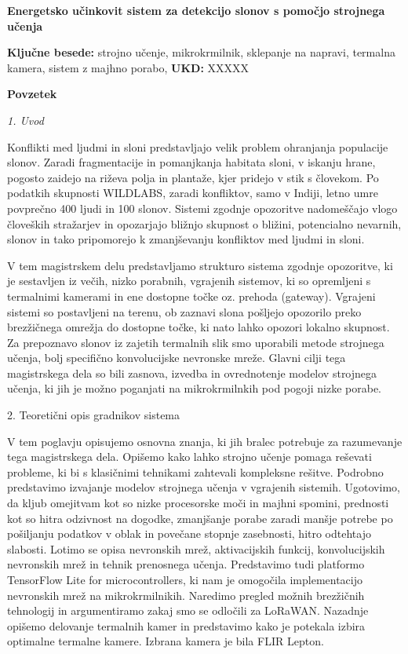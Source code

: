 \begin{poglavje}
\noindent\bfseries Energetsko učinkovit sistem za detekcijo slonov s pomočjo strojnega učenja
\end{poglavje}

\bigskip
\bigskip
\bigskip
\bigskip
\bigskip
\textbf{Ključne besede:} strojno učenje, mikrokrmilnik, sklepanje na napravi, termalna kamera, sistem z majhno porabo, 
\bigskip
\textbf{UKD:} XXXXX

\bigskip
\bigskip
\bigskip
\bigskip
\bigskip
\bigskip
\textbf{Povzetek}
\newline
\newline
{\itshape
1. Uvod

Konflikti med ljudmi in sloni predstavljajo velik problem ohranjanja populacije slonov.
Zaradi fragmentacije in pomanjkanja habitata sloni, v iskanju hrane, pogosto zaidejo na riževa polja in plantaže, kjer pridejo v stik s človekom.
Po podatkih skupnosti WILDLABS, zaradi konfliktov, samo v Indiji, letno umre povprečno 400 ljudi in 100 slonov.
Sistemi zgodnje opozoritve nadomeščajo vlogo človeških stražarjev in opozarjajo bližnjo skupnost o bližini, potencialno nevarnih, slonov in tako pripomorejo k zmanjševanju konfliktov med ljudmi in sloni.

V tem magistrskem delu predstavljamo strukturo sistema zgodnje opozoritve, ki je sestavljen iz večih, nizko porabnih, vgrajenih sistemov, ki so opremljeni s termalnimi kamerami in ene dostopne točke oz. prehoda (gateway).
Vgrajeni sistemi so postavljeni na terenu, ob zaznavi slona pošljejo opozorilo preko brezžičnega omrežja do dostopne točke, ki nato lahko opozori lokalno skupnost.
Za prepoznavo slonov iz zajetih termalnih slik smo uporabili metode strojnega učenja, bolj specifično konvolucijske nevronske mreže.
Glavni cilji tega magistrskega dela so bili zasnova, izvedba in ovrednotenje modelov strojnega učenja, ki jih je možno poganjati na mikrokrmilnkih pod pogoji nizke porabe.

2. Teoretični opis gradnikov sistema

V tem poglavju opisujemo osnovna znanja, ki jih bralec potrebuje za razumevanje tega magistrskega dela.
Opišemo kako lahko strojno učenje pomaga reševati probleme, ki bi s klasičnimi tehnikami zahtevali kompleksne rešitve. 
Podrobno predstavimo izvajanje modelov strojnega učenja v vgrajenih sistemih.
Ugotovimo, da kljub omejitvam kot so nizke procesorske moči in majhni spomini, prednosti kot so hitra odzivnost na dogodke, zmanjšanje porabe zaradi manšje potrebe po pošiljanju podatkov v oblak in povečane stopnje zasebnosti, hitro odtehtajo slabosti.
Lotimo se opisa nevronskih mrež, aktivacijskih funkcij, konvolucijskih nevronskih mrež in tehnik prenosnega učenja.
Predstavimo tudi platformo TensorFlow Lite for microcontrollers, ki nam je omogočila implementacijo nevronskih mrež na mikrokrmilnikih.
Naredimo pregled možnih brezžičnih tehnologij in argumentiramo zakaj smo se odločili za LoRaWAN.
Nazadnje opišemo delovanje termalnih kamer in predstavimo kako je potekala izbira optimalne termalne kamere.
Izbrana kamera je bila FLIR Lepton.
\newline

}
